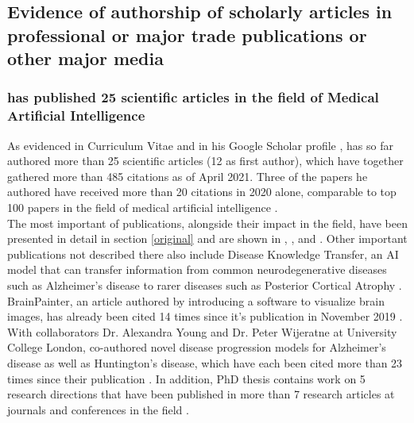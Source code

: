 \documentclass[11pt]{article}
\begin{document}

\subsection{Evidence of authorship of scholarly articles in professional or major trade publications or other major media}
\label{authorship}

\subsubsection{\dr has published 25 scientific articles in the field of Medical Artificial Intelligence}

As evidenced in \drs Curriculum Vitae \cite{cv} and in his Google Scholar profile \cite{gscholar}, \dr has so far authored more than 25 scientific articles (12 as first author), which have together gathered more than 485 citations \cite{gscholar} as of April 2021. Three of the papers he authored have received more than 20 citations in 2020 alone, comparable to top 100 papers in the field of medical artificial intelligence \cite{nadri2017top}. \\

The most important of \drs publications, alongside their impact in the field, have been presented in detail in section \ref{original} and are shown in \cite{pca}, \cite{tadpole}, \cite{dive} and \cite{dpm}. Other important publications not described there also include Disease Knowledge Transfer, an AI model that can transfer information from common neurodegenerative diseases such as Alzheimer's disease to rarer diseases such as Posterior Cortical Atrophy \cite{otherpub}. BrainPainter, an article authored by \dr introducing a software to visualize brain images, has already been cited 14 times since it's publication in November 2019 \cite{otherpub}. With collaborators Dr. Alexandra Young and Dr. Peter Wijeratne at University College London, \dr co-authored novel disease progression models for Alzheimer's disease as well as Huntington's disease, which have each been cited more than 23 times since their publication \cite{otherpub}. In addition, \drs PhD thesis contains work on 5 research directions that have been published in more than 7 research articles at journals and conferences in the field \cite{pca}.  
\end{document}
